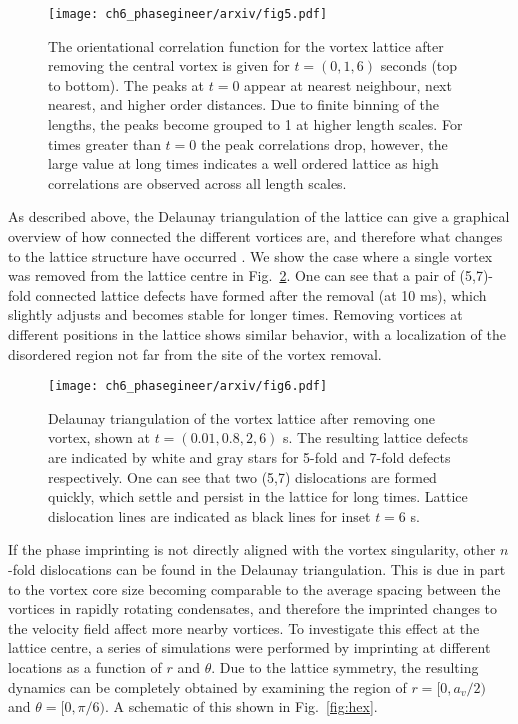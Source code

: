 \begin{figure}\centering
    \texttt{[image: ch6\_phasegineer/arxiv/fig5.pdf]}
    \caption{The orientational correlation function for the vortex lattice after removing the central vortex is given for $t=(0,1,6)$ seconds (top to bottom). The peaks at $t=0$ appear at nearest neighbour, next nearest, and higher order distances. Due to finite binning of the lengths, the peaks become grouped to 1 at higher length scales. For times greater than $t=0$ the peak correlations drop, however, the large value at long times indicates a well ordered lattice as high correlations are observed across all length scales.}\label{fig:g6}
\end{figure}

As described above, the Delaunay triangulation of the lattice can give a graphical overview of how connected the different vortices are, and therefore what changes to the lattice structure have occurred \cite{Guillamon_nat_2014}. We show the case where a single vortex was removed from the lattice centre in Fig.~\ref{fig:deltri_1vtx}. One can see that a pair of (5,7)-fold connected lattice defects have formed after the removal (at 10 ms), which slightly adjusts and becomes stable for longer times. Removing vortices at different positions in the lattice shows similar behavior, with a localization of the disordered region not far from the site of the vortex removal.

\begin{figure}\centering
    \texttt{[image: ch6\_phasegineer/arxiv/fig6.pdf]}
    \caption{Delaunay triangulation of the vortex lattice after removing one vortex, shown at $t=(0.01,0.8,2,6)$ s. The resulting lattice defects are indicated by white and gray stars for 5-fold and 7-fold defects respectively. One can see that two (5,7) dislocations are formed quickly, which settle and persist in the lattice for long times. Lattice dislocation lines are indicated as black lines for inset $t=6$ s.}\label{fig:deltri_1vtx}
\end{figure}

If the phase imprinting is not directly aligned with the vortex singularity, other $n$-fold dislocations can be found in the Delaunay triangulation. This is due in part to the vortex core size becoming comparable to the average spacing between the vortices in rapidly rotating condensates, and therefore the imprinted changes to the velocity field affect more nearby vortices. To investigate this effect at the lattice centre, a series of simulations were performed by imprinting at different locations as a function of $r$ and $\theta$. Due to the lattice symmetry, the resulting dynamics can be completely obtained by examining the region of $r=[0,a_v/2)$ and $\theta=[0,\pi/6)$. A schematic of this shown in Fig.~\ref{fig:hex}.

